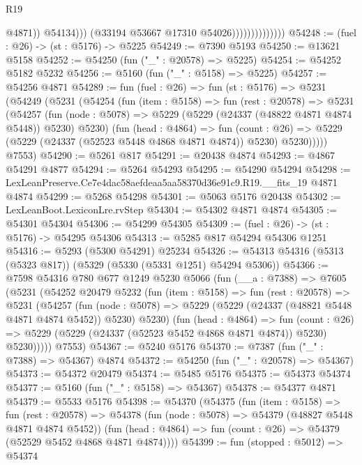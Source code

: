 \begin{lexlean}{R19}
\begin{coremodule}
                                        @4871))
                                    @54134)))
                              (@33194 @53667 @17310 @54026))))))))))))))
@54248 := (fuel : @26) -> (st : @5176) -> @5225
@54249 := @7390 @5193
@54250 := @13621 @5158
@54252 := @54250 (fun ("_" : @20578) => @5225)
@54254 := @54252 @5182 @5232
@54256 := @5160 (fun ("_" : @5158) => @5225)
@54257 := @54256 @4871
@54289 := fun (fuel : @26) =>
  fun (st : @5176) =>
  @5231
    (@54249
      (@5231
        (@54254
          (fun (item : @5158) =>
          fun (rest : @20578) =>
          @5231
            (@54257
              (fun (node : @5078) => @5229 (@5229 (@24337 (@48822 @4871 @4874 @5448)) @5230) @5230)
              (fun (head : @4864) =>
              fun (count : @26) =>
              @5229 (@5229 (@24337 (@52523 @5448 @4868 @4871 @4874)) @5230) @5230)))))
      @7553)
@54290 := @5261 @817
@54291 := @20438 @4874
@54293 := @4867 @54291 @4877
@54294 := @5264 @54293
@54295 := @54290 @54294
@54298 := LexLeanPreserve.Ce7e4dac58aefdeaa5aa58370d36e91c9.R19.__fits_19 @4871 @4874
@54299 := @5268 @54298
@54301 := @5063 @5176 @20438
@54302 := LexLeanBoot.LexiconLre.rvStep
@54304 := @54302 @4871 @4874
@54305 := @54301 @54304
@54306 := @54299 @54305
@54309 := (fuel : @26) -> (st : @5176) -> @54295 @54306
@54313 := @5285 @817 @54294 @54306 @1251
@54316 := @5293 (@5300 @54291) @25234
@54326 := @54313 @54316 (@5313 (@5323 @817)) (@5329 (@5330 (@5331 @1251) @54294 @5306))
@54366 := @7598
    @54316
    @780
    @677
    @1249
    @5230
    @5066
    (fun (__a : @7388) =>
    @7605
      (@5231
        (@54252
          @20479
          @5232
          (fun (item : @5158) =>
          fun (rest : @20578) =>
          @5231
            (@54257
              (fun (node : @5078) =>
              @5229 (@5229 (@24337 (@48821 @5448 @4871 @4874 @5452)) @5230) @5230)
              (fun (head : @4864) =>
              fun (count : @26) =>
              @5229 (@5229 (@24337 (@52523 @5452 @4868 @4871 @4874)) @5230) @5230)))))
      @7553)
@54367 := @5240 @5176
@54370 := @7387 (fun ("_" : @7388) => @54367) @4874
@54372 := @54250 (fun ("_" : @20578) => @54367)
@54373 := @54372 @20479
@54374 := @5485 @5176
@54375 := @54373 @54374
@54377 := @5160 (fun ("_" : @5158) => @54367)
@54378 := @54377 @4871
@54379 := @5533 @5176
@54398 := @54370
    (@54375
      (fun (item : @5158) =>
      fun (rest : @20578) =>
      @54378
        (fun (node : @5078) => @54379 (@48827 @5448 @4871 @4874 @5452))
        (fun (head : @4864) => fun (count : @26) => @54379 (@52529 @5452 @4868 @4871 @4874))))
@54399 := fun (stopped : @5012) => @54374

\end{coremodule}
\end{lexlean}
